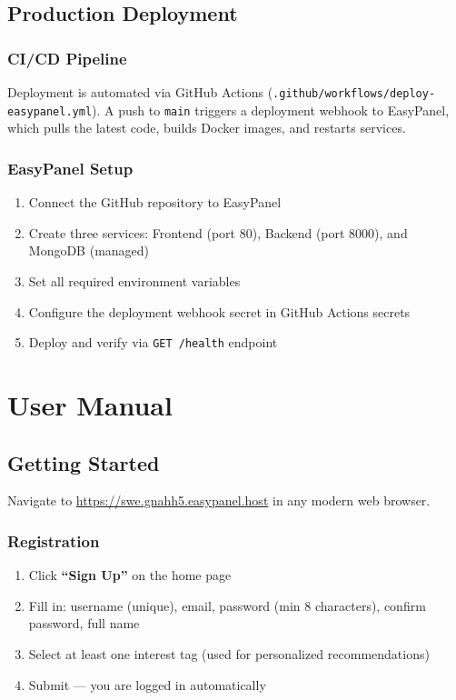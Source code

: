 \documentclass[11pt,a4paper]{report}
\begin{document}
\section{Production Deployment}

\subsection{CI/CD Pipeline}

Deployment is automated via GitHub Actions (\texttt{.github/workflows/deploy-easypanel.yml}). A push to \texttt{main} triggers a deployment webhook to EasyPanel, which pulls the latest code, builds Docker images, and restarts services.

\subsection{EasyPanel Setup}

\begin{enumerate}
    \item Connect the GitHub repository to EasyPanel
    \item Create three services: Frontend (port 80), Backend (port 8000), and MongoDB (managed)
    \item Set all required environment variables
    \item Configure the deployment webhook secret in GitHub Actions secrets
    \item Deploy and verify via \texttt{GET /health} endpoint
\end{enumerate}

\chapter{User Manual}

\section{Getting Started}

Navigate to \url{https://swe.gnahh5.easypanel.host} in any modern web browser.

\subsection{Registration}

\begin{enumerate}
    \item Click \textbf{``Sign Up''} on the home page
    \item Fill in: username (unique), email, password (min 8 characters), confirm password, full name
    \item Select at least one interest tag (used for personalized recommendations)
    \item Submit --- you are logged in automatically
\end{enumerate}
\end{document}
